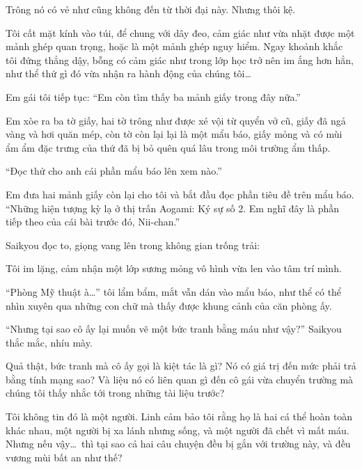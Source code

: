 \documentclass[../main.tex]{subfiles}
\begin{document}
Trông nó có vẻ như cũng không đến từ thời đại này. Nhưng thôi kệ.

Tôi cất mặt kính vào túi, để chung với dây đeo, cảm giác như vừa nhặt được một mảnh ghép quan trọng, hoặc là một mảnh ghép nguy hiểm. Ngay khoảnh khắc tôi đứng thẳng dậy, bỗng có cảm giác như trong lớp học trở nên im ắng hơn hẳn, như thể thứ gì đó vừa nhận ra hành động của chúng tôi\dots

Em gái tôi tiếp tục: ``Em còn tìm thấy ba mảnh giấy trong đây nữa.''

Em xòe ra ba tờ giấy, hai tờ trông như được xé vội từ quyển vở cũ, giấy đã ngả vàng và hơi quăn mép, còn tờ còn lại lại là một mẩu báo, giấy mỏng và có mùi ẩm ẩm đặc trưng của thứ đã bị bỏ quên quá lâu trong môi trường ẩm thấp.

``Đọc thử cho anh cái phần mẩu báo lên xem nào.''

Em đưa hai mảnh giấy còn lại cho tôi và bắt đầu đọc phần tiêu đề trên mẩu báo. ``{\vnmsans Những hiện tượng kỳ lạ ở thị trấn Aogami: Ký sự số 2.} Em nghĩ đây là phần tiếp theo của cái bài trước đó, Nii-chan.''

Saikyou đọc to, giọng vang lên trong không gian trống trải:


Tôi im lặng, cảm nhận một lớp sương mỏng vô hình vừa len vào tâm trí mình.

``Phòng Mỹ thuật à\dots'' tôi lẩm bẩm, mắt vẫn dán vào mẩu báo, như thể có thể nhìn xuyên qua những con chữ mà thấy được khung cảnh của căn phòng ấy.

``Nhưng tại sao cô ấy lại muốn vẽ một bức tranh bằng máu như vậy?'' Saikyou thắc mắc, nhíu mày.

Quả thật, bức tranh mà cô ấy gọi là kiệt tác là gì? Nó có giá trị đến mức phải trả bằng tính mạng sao? Và liệu nó có liên quan gì đến cô gái vừa chuyển trường mà chúng tôi thấy nhắc tới trong những tài liệu trước?

Tôi không tin đó là một người. Linh cảm bảo tôi rằng họ là hai cá thể hoàn toàn khác nhau, một người bị xa lánh nhưng sống, và một người đã chết vì mất máu. Nhưng nếu vậy\dots\ thì tại sao cả hai câu chuyện đều bị gắn với trường này, và đều vương mùi bất an như thế?
\end{document}
